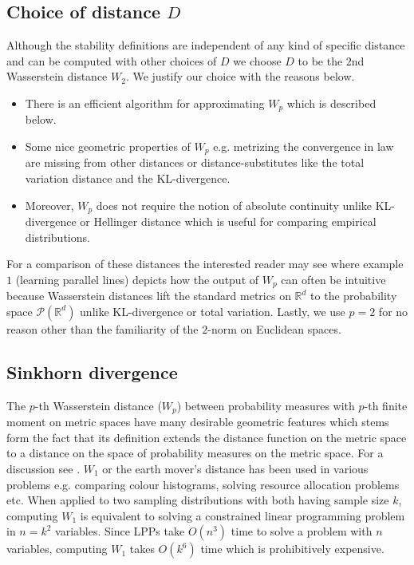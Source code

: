 {\color{mypink}\subsection{Choice of distance $D$} Although the stability definitions are independent of  any kind of specific distance and can be computed with other choices of $D$ we choose $D$ to be the $2$nd Wasserstein distance $W_2$. We justify our choice with the reasons below.
\begin{itemize}
    \item There is an efficient algorithm for approximating $W_p$ which is described below. 
    \item Some nice geometric properties of $W_p$ e.g. metrizing the convergence in law \cite{feydy2019interpolating} are missing from other distances or distance-substitutes like the  total variation distance and  the KL-divergence. 
    \item Moreover, $W_p$ does not require the notion of absolute continuity unlike KL-divergence or Hellinger distance which is useful for comparing empirical distributions.
\end{itemize}
For a comparison of these distances the interested reader may see \cite{arjovsky2017wasserstein} where example $1$ (learning parallel lines) depicts how the output of $W_p$ can often be intuitive because Wasserstein distances lift the standard metrics on $\mathbb R^d$ to the probability space $\mathcal P(\mathbb R^d)$ unlike KL-divergence or total variation. Lastly, we use $p=2$ for no reason other than the familiarity of the $2$-norm on Euclidean spaces.}

\subsection{Sinkhorn divergence} \label{ssec-sink--probing-nfs}

The $p$-th Wasserstein distance ($W_p$) between probability measures with $p$-th finite moment on metric spaces have many desirable geometric features which stems form the fact that its definition extends the distance function on the metric space to a distance on the space of probability measures on the metric space. For a discussion see \cite{feydy2019interpolating, arjovsky2017wasserstein}. $W_1$ or the earth mover's distance has been used in various problems e.g. comparing colour histograms, solving resource allocation problems etc. When applied to two sampling distributions with both having sample size $k$, computing $W_1$ is equivalent to solving a constrained linear programming problem in $n = k^2$ variables. Since LPPs take $O(n^3)$ time to solve a problem with $n$ variables, computing $W_1$ takes $O(k^6)$ time which is prohibitively expensive.

